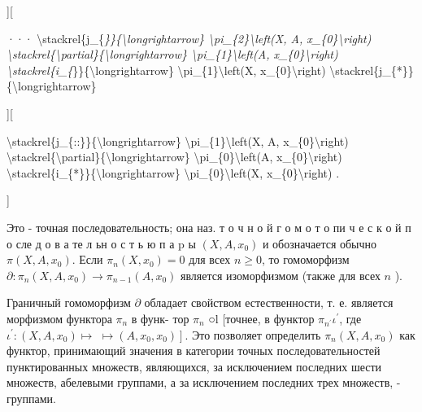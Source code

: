 \documentclass[10pt]{article}
\begin{document}
][



··· \textbackslash stackrel\{j\_\{\textit{\}\}\{\textbackslash longrightarrow\} \textbackslash pi\_\{2\}\textbackslash left(X, A, x\_\{0\}\textbackslash right) \textbackslash stackrel\{\textbackslash partial\}\{\textbackslash longrightarrow\} \textbackslash pi\_\{1\}\textbackslash left(A, x\_\{0\}\textbackslash right) \textbackslash stackrel\{i\_\{}\}\}\{\textbackslash longrightarrow\} \textbackslash pi\_\{1\}\textbackslash left(X, x\_\{0\}\textbackslash right) \textbackslash stackrel\{j\_\{*\}\}\{\textbackslash longrightarrow\}



][



\textbackslash stackrel\{j\_\{::\}\}\{\textbackslash longrightarrow\} \textbackslash pi\_\{1\}\textbackslash left(X, A, x\_\{0\}\textbackslash right) \textbackslash stackrel\{\textbackslash partial\}\{\textbackslash longrightarrow\} \textbackslash pi\_\{0\}\textbackslash left(A, x\_\{0\}\textbackslash right) \textbackslash stackrel\{i\_\{*\}\}\{\textbackslash longrightarrow\} \textbackslash pi\_\{0\}\textbackslash left(X, x\_\{0\}\textbackslash right) .

]



Это - точная последовательность; она наз. т о ч н о й г о м о т о пи ч е с к о й п о сле д о в а те л ьн о с т ь ю п а $\mathrm{p}$ ы $\left(X, A, x_{0}\right)$ и обозначается обычно $\pi\left(X, A, x_{0}\right)$. Если $\pi_{n}\left(X, x_{0}\right)=0$ для всех $n \geqslant 0$, то гомоморфизм $\partial: \pi_{n}\left(X, A, x_{0}\right) \rightarrow \pi_{n-1}\left(A, x_{0}\right)$ является изоморфизмом (также для всех $n$ ).



Граничный гомоморфизм $\partial$ обладает свойством естественности, т. е. является морфизмом функтора $\pi_{n}$ в функ- тор $\pi_{n}$ ○l [точнее, в функтор $\pi_{n^{\prime}} \iota^{\prime}$, где $\iota^{\prime}:\left(X, A, x_{0}\right) \mapsto$ $\left.\mapsto\left(A, x_{0}, x_{0}\right)\right]$. Это позволяет определить $\pi_{n}\left(X, A, x_{0}\right)$ как функтор, принимающий значения в категории точных последовательностей пунктированных множеств, являющихся, за исключением последних шести множеств, абелевыми группами, а за исключением последних трех множеств, - группами.
\end{document}
